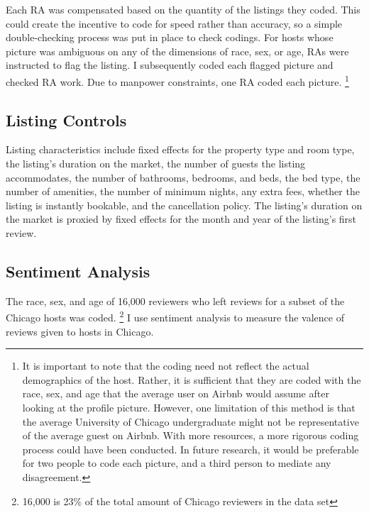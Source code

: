 
Each RA was compensated based on the quantity of the listings they coded. This could create the incentive to code for speed rather than accuracy, so a simple double-checking process was put in place to check codings. For hosts whose picture was ambiguous on any of the dimensions of race, sex, or age, RAs were instructed to flag the listing. I subsequently coded each flagged picture and checked RA work. Due to manpower constraints, one RA coded each picture.%
	\footnote{It is important to note that the coding need not reflect the actual demographics of the host. Rather, it is sufficient that they are coded with the race, sex, and age that the average user on Airbnb would assume after looking at the profile picture. However, one limitation of this method is that the average University of Chicago undergraduate might not be representative of the average guest on Airbnb. With more resources, a more rigorous coding process could have been conducted. In future research, it would be preferable for two people to code each picture, and a third person to mediate any disagreement.}


\subsection*{Listing Controls}
Listing characteristics include fixed effects for the property type and room type, the listing's duration on the market, the number of guests the listing accommodates, the number of bathrooms, bedrooms, and beds, the bed type, the number of amenities, the number of minimum nights, any extra fees, whether the listing is instantly bookable, and the cancellation policy. The listing's duration on the market is proxied by fixed effects for the month and year of the listing's first review.

\subsection*{Sentiment Analysis}

The race, sex, and age of 16,000 reviewers who left reviews for a subset of the Chicago hosts was coded.%
	\footnote{16,000 is 23\% of the total amount of Chicago reviewers in the data set} 
I use sentiment analysis to measure the valence of reviews given to hosts in Chicago. 

